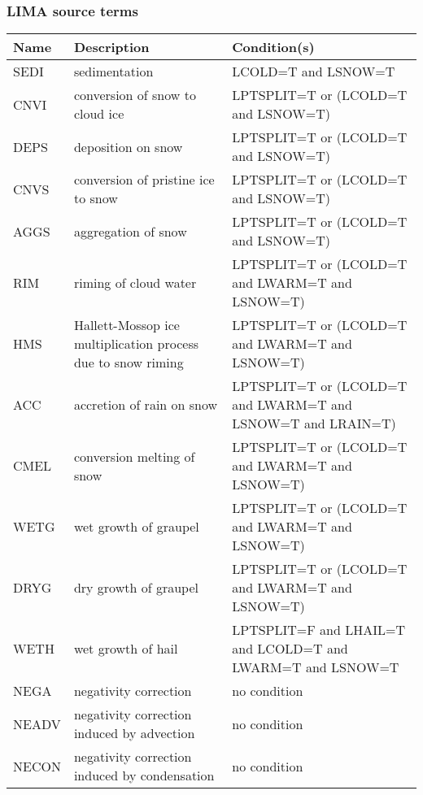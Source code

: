 \subsubsection{LIMA source terms}

\begin{longtable} {|p{}|p{}|p{}|}
\hline
Name & Description & Condition(s) \\
\hline \hline
\endhead
SEDI   & sedimentation                                 & LCOLD=T and LSNOW=T \\\hline
CNVI   & conversion of snow to cloud ice               & LPTSPLIT=T or (LCOLD=T and LSNOW=T) \\\hline
DEPS   & deposition on snow                            & LPTSPLIT=T or (LCOLD=T and LSNOW=T) \\\hline
CNVS   & conversion of pristine ice to snow            & LPTSPLIT=T or (LCOLD=T and LSNOW=T) \\\hline
AGGS   & aggregation of snow                           & LPTSPLIT=T or (LCOLD=T and LSNOW=T) \\\hline
RIM    & riming of cloud water                         & LPTSPLIT=T or (LCOLD=T and LWARM=T and LSNOW=T) \\\hline
HMS    & Hallett-Mossop ice multiplication process due to snow riming    & LPTSPLIT=T or (LCOLD=T and LWARM=T and LSNOW=T) \\\hline
ACC    & accretion of rain on snow                     & LPTSPLIT=T or (LCOLD=T and LWARM=T and LSNOW=T and LRAIN=T) \\\hline
CMEL   & conversion melting of snow                    & LPTSPLIT=T or (LCOLD=T and LWARM=T and LSNOW=T) \\\hline
WETG   & wet growth of graupel                         & LPTSPLIT=T or (LCOLD=T and LWARM=T and LSNOW=T) \\\hline
DRYG   & dry growth of graupel                         & LPTSPLIT=T or (LCOLD=T and LWARM=T and LSNOW=T) \\\hline
WETH   & wet growth of hail                            & LPTSPLIT=F and LHAIL=T and LCOLD=T and LWARM=T and LSNOW=T \\\hline
NEGA   & negativity correction                         & no condition \\\hline
NEADV  & negativity correction induced by advection    & no condition \\\hline
NECON  & negativity correction induced by condensation & no condition \\\hline
\end{longtable}

